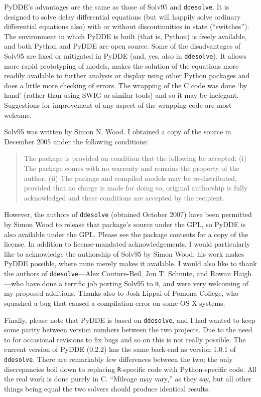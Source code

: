 \documentclass[10pt,a4paper] {article}
\begin{document}
PyDDE's advantages are the same as those of Solv95 and \verb+ddesolve+.  It is designed to solve delay differential equations (but will happily solve ordinary differential equations also) with or without discontinuities in state (``switches'').  The environment in which PyDDE is built (that is, Python) is freely available, and both Python and PyDDE are open source.  Some of the disadvantages of Solv95 are fixed or mitigated in PyDDE (and, yes, also in \verb+ddesolve+).  It allows more rapid prototyping of models, makes the solution of the equations more readily available to further analysis or display using other Python packages and does a little more checking of errors.  The wrapping of the C code was done `by hand' (rather than using SWIG or similar tools) and so it may be inelegant.  Suggestions for improvement of any aspect of the wrapping code are most welcome.

Solv95 was written by Simon N. Wood.  I obtained a copy of the source in December 2005 under the following conditions:
\begin{quotation}The package is provided on condition that the following be accepted: (i) The package comes with %
no warrenty and remains the property of the author. (ii) The package and compiled models may be %
re-distributed, provided that no charge is made for doing so, original authorship is fully %
acknowledged and these conditions are accepted by the recipient.\end{quotation}
However, the authors of \verb+ddesolve+ (obtained October 2007) have been permitted by Simon Wood to release that package's source under the GPL, so PyDDE is also available under the GPL.  Please see the package contents for a copy of the license.  In addition to license-mandated acknowledgements, I would particularly like to acknowledge the authorship of Solv95 by Simon Wood; his work makes PyDDE possible, where mine merely makes it available.  I would also like to thank the authors of \verb+ddesolve+---Alex Couture-Beil, Jon T. Schnute, and Rowan Haigh---who have done a terrific job porting Solv95 to \verb+R+, and were very welcoming of my proposed additions.  Thanks also to Josh Lippai of Pomona College, who squashed a bug that caused a compilation error on some OS X systems.

Finally, please note that PyDDE is based on \verb+ddesolve+, and I had wanted to keep some parity between version numbers between the two projects.  Due to the need to for occasional revisions to fix bugs and so on this is not really possible.  The current version of PyDDE (0.2.2) has the same back-end as version 1.0.1 of \verb+ddesolve+.  There are remarkably few differences between the two; the only discrepancies boil down to replacing \verb+R+-specific code with Python-specific code.  All the real work is done purely in C.  ``Mileage may vary,'' as they say, but all other things being equal the two solvers should produce identical results.
\end{document}
